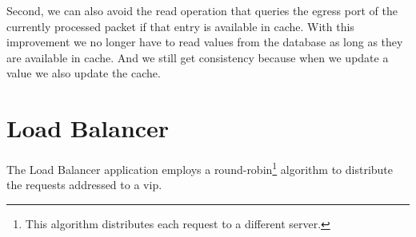 Second, we can also avoid the read operation that queries the egress port of the currently processed packet if that entry is  available in cache. 
With this improvement we no longer have to read values from the database as long as they are available in cache.
And we still get consistency because when we update a value we also update the cache. 





\section{Load Balancer}
\label{sec:feasibility:lb}
\glsresetall
The Load Balancer application employs a round-robin\footnote{This algorithm distributes each request to a different server.} algorithm to distribute the requests addressed to a \gls{vip}.

